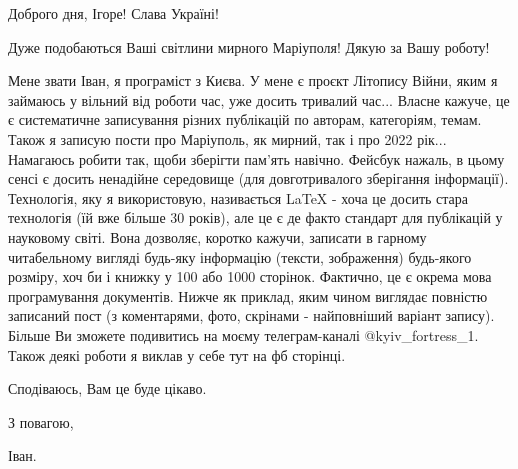  
 
 
 
 

Доброго дня, Ігоре! Слава Україні!

Дуже подобаються Ваші світлини мирного Маріуполя! Дякую за Вашу роботу! 

Мене звати Іван, я програміст з Києва. У мене є проєкт Літопису Війни, яким я
займаюсь у вільний від роботи час, уже досить тривалий час... Власне кажуче, це є систематичне записування
різних публікацій по авторам, категоріям, темам. Також я записую пости про
Маріуполь, як мирний, так і про 2022 рік... Намагаюсь робити так, щоби зберігти
пам'ять навічно.  Фейсбук нажаль, в цьому сенсі є досить ненадійне середовище
(для довготривалого зберігання інформації).  Технологія, яку я використовую,
називається LaTeX - хоча це досить стара технологія (їй вже більше 30 років),
але це є де факто стандарт для публікацій у науковому світі.  Вона дозволяє,
коротко кажучи, записати в гарному читабельному вигляді будь-яку інформацію
(тексти, зображення) будь-якого розміру, хоч би і книжку у 100 або 1000
сторінок. Фактично, це є окрема мова програмування документів. Нижче як
приклад, яким чином виглядає повністю записаний пост (з коментарями, фото,
скрінами - найповніший варіант запису).  Більше Ви зможете подивитись на моєму
телеграм-каналі @kyiv_fortress_1. Також деякі роботи я виклав у себе тут на фб
сторінці.

Сподіваюсь, Вам це буде цікаво.

З повагою,

Іван.
